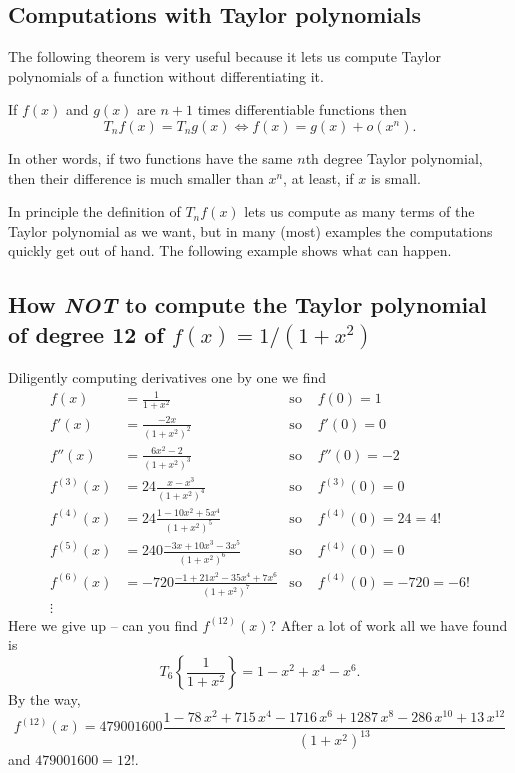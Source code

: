 \subsection{Computations with Taylor polynomials} %
\label{sec:comp-with-taylor}
The following theorem is very useful because it lets us  compute Taylor
polynomials of a function without differentiating it.
\begin{theorem}\label{thm:fisg-to-order-n}
  If $f (x)$ and $g (x)$ are $n+1$ times differentiable functions then
  \begin{equation}
    \label{eq:fisg-to-order-n}
    T_nf(x) = T_ng(x) \iff f(x) = g(x) + o(x^n).
  \end{equation}
\end{theorem}%
In other words, if two functions have the same $n$th degree Taylor
polynomial, then their difference is much smaller than $x^n$, at least, if
$x$ is small.

In principle the definition of $T_nf(x)$ lets us  compute as many terms of
the Taylor polynomial as we  want, but in many (most) examples the
computations quickly get out of hand. The following example shows what can
happen.


\subsection{How \textit{NOT} to compute the Taylor polynomial of degree 12 %
of $f(x)=1/ (1+x^2)$}
Diligently computing derivatives one by one we  find
\begin{align*}
  f(x) &= \frac1{1+x^2} &\text{so }& f(0) = 1 \\
  f'(x) &= \frac{-2x}{(1+x^2)^2} &\text{so }&f'(0)=0 \\
  f'' (x)&=\frac{6x^2-2} {(1+x^2)^3} &\text{so }&f''(0) = -2 \\
  f^{(3)} (x) &= 24 \frac{x-x^3}{(1+x^2)^4}  &\text{so }&f^{(3)}(0) = 0 \\
  f^{(4)}(x) &= 24\frac{1-10x^2+5x^4}{(1+x^2)^5}
  &\text{so }&f^{(4)}(0) = 24 = 4! \\
  f^{(5)}(x) &= 240\frac{-3x+10x^3-3x^5}{(1+x^2)^6}
  &\text{so }&f^{(4)}(0) = 0  \\
  f^{(6)}(x) &= -720\frac{-1+21x^2-35x^4+7x^6}{(1+x^2)^7}
  &\text{so }&f^{(4)}(0) = -720 = -6!  \\
  \vdots
\end{align*}
Here we give up -- can you find $f^{(12)} (x)$?  After a lot of work all we have
found is
\[
T_6\left\{\frac1{1+x^2}\right\} = 1-x^2 + x^4-x^6.
\]
By the way,
\[
f^{(12)}(x) = 479001600
\frac{1-78\,x^2+715\,x^4-1716\,x^6+1287\,x^8-286\,x^{10}+13\,x^{12}}
{(1+x^2)^{13}}
\]
and $479001600=12!$.


